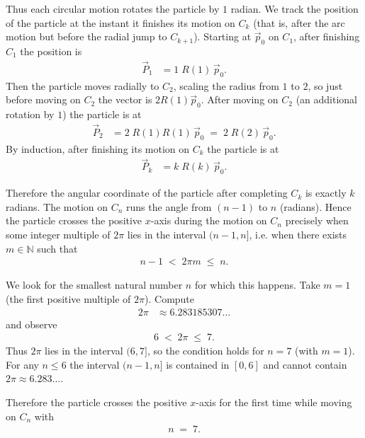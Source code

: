 \documentclass[journal]{IEEEtran}
\begin{document}
Thus each circular motion rotates the particle by $1$ radian.  We track the position of the particle at the instant it finishes its motion on $C_k$ (that is, after the arc motion but before the radial jump to $C_{k+1}$).  
Starting at $\vec{p}_0$ on $C_1$, after finishing $C_1$ the position is
\begin{align}
    \vec{P}_1 &= 1\;R(1)\,\vec{p}_0.
\end{align}
Then the particle moves radially to $C_2$, scaling the radius from $1$ to $2$, so just before moving on $C_2$ the vector is $2R(1)\vec{p}_0$. After moving on $C_2$ (an additional rotation by $1$) the particle is at
\begin{align}
    \vec{P}_2 &= 2\;R(1)R(1)\,\vec{p}_0 \;=\; 2\;R(2)\,\vec{p}_0.
\end{align}
By induction, after finishing its motion on $C_k$ the particle is at
\begin{align}
    \vec{P}_k &= k\;R(k)\,\vec{p}_0.
\end{align}

Therefore the angular coordinate of the particle after completing $C_k$ is exactly $k$ radians.
The motion on $C_n$ runs the angle from $(n-1)$ to $n$ (radians).  
Hence the particle crosses the positive $x$-axis during the motion on $C_n$ precisely when some integer multiple of $2\pi$ lies in the interval $(n-1,n]$, i.e. when there exists $m\in\mathbb{N}$ such that
\begin{align}
    n-1 \;<\; 2\pi m \;\le\; n .
\end{align}

We look for the smallest natural number $n$ for which this happens.  
Take $m=1$ (the first positive multiple of $2\pi$). Compute
\begin{align}
    2\pi &\approx 6.283185307\ldots
\end{align}
and observe
\begin{align}
    6 \;<\; 2\pi \;\le\; 7.
\end{align}
Thus $2\pi$ lies in the interval $(6,7]$, so the condition holds for $n=7$ (with $m=1$).  
For any $n\le 6$ the interval $(n-1,n]$ is contained in $[0,6]$ and cannot contain $2\pi\approx 6.283\ldots$.

Therefore the particle crosses the positive $x$-axis for the first time while moving on $C_n$ with
\begin{align}
    \boxed{n \;=\; 7.}
\end{align}
\end{document}
